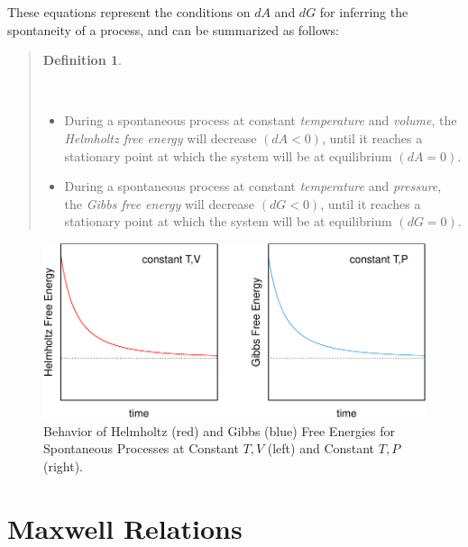 \documentclass[
  9pt,
]{extbook}
\providecommand{\tightlist}{%
  \setlength{\itemsep}{0pt}\setlength{\parskip}{0pt}}
\theoremstyle{definition}
\newtheorem{definition}{Definition}[chapter]
\theoremstyle{definition}
\theoremstyle{definition}
\theoremstyle{definition}
\theoremstyle{remark}
\begin{document}
These equations represent the conditions on \(dA\) and \(dG\) for inferring the spontaneity of a process, and can be summarized as follows:

\begin{quote}
\begin{definition}
\protect\hypertarget{def:helmgibbsminimum}{}\label{def:helmgibbsminimum}

\(\;\)

\begin{itemize}
\tightlist
\item
  During a spontaneous process at constant \emph{temperature} and \emph{volume}, the \emph{Helmholtz free energy} will decrease \((dA<0)\), until it reaches a stationary point at which the system will be at equilibrium \((dA=0)\).
\item
  During a spontaneous process at constant \emph{temperature} and \emph{pressure}, the \emph{Gibbs free energy} will decrease \((dG<0)\), until it reaches a stationary point at which the system will be at equilibrium \((dG=0)\).
\end{itemize}

\end{definition}
\end{quote}

\begin{figure}

{\centering \includegraphics{pchem1_files/figure-latex/agfig-1} 

}

\caption{Behavior of Helmholtz (red) and Gibbs (blue) Free Energies for Spontaneous Processes at Constant $T,V$ (left) and Constant $T,P$ (right).}\label{fig:agfig}
\end{figure}

\section{Maxwell Relations}\label{maxwell}
\end{document}
